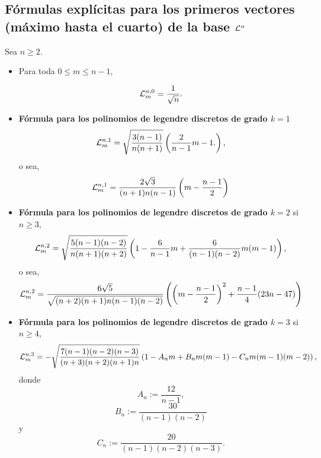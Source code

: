 \subsection{Fórmulas explícitas para los primeros vectores (máximo hasta el cuarto) de la base $\mathcal{L}^{n}$}

Sea $n \geq 2$.
\begin{itemize}
\item Para toda $0 \leq m \leq n-1$, 

\begin{equation}
\label{eq: Ln, 0, m}
\mathcal{L}^{n,0}_{m}=\frac{1}{\sqrt{n}}.
\end{equation}

\item \textbf{Fórmula para los polinomios de legendre discretos
de grado $k=1$}
\[
\mathcal{L}^{n,1}_{m}=\sqrt{\frac{3(n-1)}{n(n+1)}} \left( \frac{2}{n-1}m -1. \right),
\]
o sea, 
\begin{equation}
\label{eq: Ln, 1, m}
\mathcal{L}^{n,1}_{m}=\frac{2\sqrt{3}}{(n+1)n(n-1)} \left( m-\frac{n-1}{2} \right)
\end{equation}

\item \textbf{Fórmula para los polinomios de legendre discretos
de grado $k=2$} si $n \geq 3$,
\[
\mathcal{L}^{n,2}_{m}=\sqrt{\frac{5(n-1)(n-2)}{n(n+1)(n+2)}} \left(1- \frac{6}{n-1}m + \frac{6}{(n-1)(n-2)}m(m-1) \right),
\]
o sea, 
\[
\mathcal{L}^{n,2}_{m}=\frac{6\sqrt{5}}{\sqrt{(n+2)(n+1)n(n-1)(n-2)}} \left(
\left( m-\frac{n-1}{2} \right)^{2}+\frac{n-1}{4}(23n-47)
\right)
\]


\item \textbf{Fórmula para los polinomios de legendre discretos
de grado $k=3$} si $n \geq 4$,
\[
\mathcal{L}^{n,3}_{m}=-\sqrt{\frac{7(n-1)(n-2)(n-3)}{(n+3)(n+2)(n+1)n}}
\left( 1- A_{n}m + B_{n}m(m-1)-
C_{n}m(m-1)(m-2) \right),
\]
donde
\[
A_{n}:= \frac{12}{n-1},
\]
\[
B_{n} := \frac{30}{(n-1)(n-2)}
\]
y
\[
C_{n} := \frac{20}{(n-1)(n-2)(n-3)}.
\]
\end{itemize}


